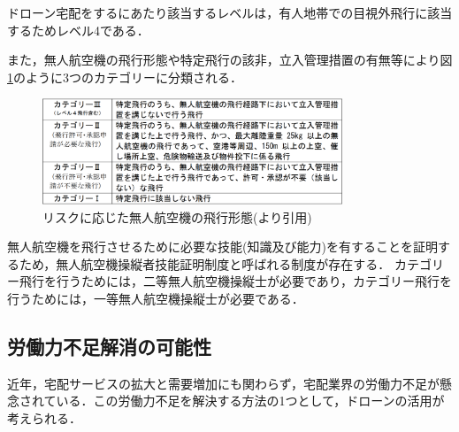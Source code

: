 \documentclass[a4paper, titlepage]{jsarticle}
\begin{document}
ドローン宅配をするにあたり該当するレベルは，有人地帯での目視外飛行に該当するためレベル4である．

また，無人航空機の飛行形態や特定飛行の該非，立入管理措置の有無等により図\ref{fig:dron_category}のように3つのカテゴリーに分類される．
\begin{figure}[htbp]
  \centering
  \includegraphics[width=0.8\textwidth]{dron_category.pdf}
  \caption{リスクに応じた無人航空機の飛行形態(\cite{delivery_guidelines_2023}より引用)}
  \label{fig:dron_category}
\end{figure}

無人航空機を飛行させるために必要な技能(知識及び能力)を有することを証明するため，無人航空機操縦者技能証明制度と呼ばれる制度が存在する．
カテゴリー飛行を行うためには，二等無人航空機操縦士が必要であり，カテゴリー飛行を行うためには，一等無人航空機操縦士が必要である\cite{delivery_guidelines_2023}．

\subsection{労働力不足解消の可能性}
近年，宅配サービスの拡大と需要増加にも関わらず，宅配業界の労働力不足が懸念されている．この労働力不足を解決する方法の1つとして，ドローンの活用が考えられる．

\end{document}
